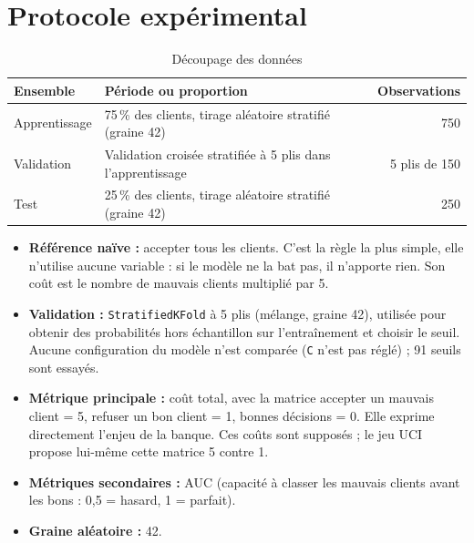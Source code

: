 \documentclass[11pt,a4paper]{article}
\begin{document}
\section{Protocole expérimental}
\label{sec:protocole}
\begin{table}[htbp]
  \centering
  \caption{Découpage des données}
  \label{tab:decoupage}
  \small
  \begin{tabular}{@{}l l r@{}}
    \toprule
    Ensemble & Période ou proportion & Observations \\
    \midrule
    Apprentissage & 75\,\% des clients, tirage aléatoire stratifié (graine 42) & 750 \\
    Validation & Validation croisée stratifiée à 5 plis dans l'apprentissage & 5 plis de 150 \\
    Test & 25\,\% des clients, tirage aléatoire stratifié (graine 42) & 250 \\
    \bottomrule
  \end{tabular}
\end{table}

\begin{itemize}
  \item \textbf{Référence naïve :} accepter tous les clients. C'est la règle la plus simple, elle n'utilise aucune variable : si le modèle ne la bat pas, il n'apporte rien. Son coût est le nombre de mauvais clients multiplié par 5.
  \item \textbf{Validation :} \texttt{StratifiedKFold} à 5 plis (mélange, graine 42), utilisée pour obtenir des probabilités hors échantillon sur l'entraînement et choisir le seuil. Aucune configuration du modèle n'est comparée (\texttt{C} n'est pas réglé) ; 91 seuils sont essayés.
  \item \textbf{Métrique principale :} coût total, avec la matrice accepter un mauvais client = 5, refuser un bon client = 1, bonnes décisions = 0. Elle exprime directement l'enjeu de la banque. Ces coûts sont supposés ; le jeu UCI propose lui-même cette matrice 5 contre 1.
  \item \textbf{Métriques secondaires :} AUC (capacité à classer les mauvais clients avant les bons : 0,5 = hasard, 1 = parfait).
  \item \textbf{Graine aléatoire :} 42.
\end{itemize}

\end{document}
